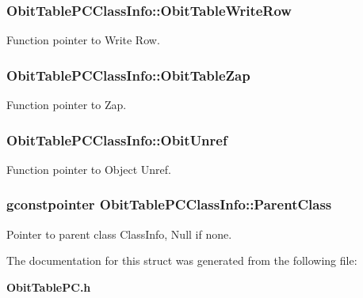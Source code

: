 \subsubsection{ {\bf Obit\-Table\-PCClass\-Info::Obit\-Table\-Write\-Row}}\label{structObitTablePCClassInfo_o26}


Function pointer to Write Row. 

\subsubsection{ {\bf Obit\-Table\-PCClass\-Info::Obit\-Table\-Zap}}\label{structObitTablePCClassInfo_o19}


Function pointer to Zap. 

\subsubsection{ {\bf Obit\-Table\-PCClass\-Info::Obit\-Unref}}\label{structObitTablePCClassInfo_o11}


Function pointer to Object Unref. 

\subsubsection{\setlength{\rightskip}{0pt plus 5cm}gconstpointer {\bf Obit\-Table\-PCClass\-Info::Parent\-Class}}\label{structObitTablePCClassInfo_o3}


Pointer to parent class Class\-Info, Null if none. 



The documentation for this struct was generated from the following file:\begin{CompactItemize}
\item 
{\bf Obit\-Table\-PC.h}\end{CompactItemize}
